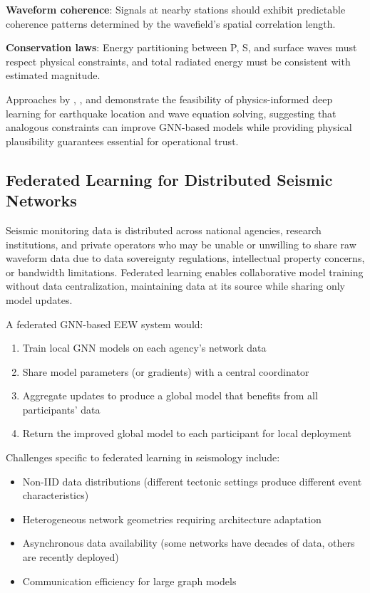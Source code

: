 \documentclass[review,authoryear]{elsarticle}
\begin{document}
\textbf{Waveform coherence}: Signals at nearby stations should exhibit predictable coherence patterns determined by the wavefield's spatial correlation length.

\textbf{Conservation laws}: Energy partitioning between P, S, and surface waves must respect physical constraints, and total radiated energy must be consistent with estimated magnitude.

Approaches by \citet{rasht2022physics}, \citet{smith2022hyposvi}, and \citet{moseley2020solving} demonstrate the feasibility of physics-informed deep learning for earthquake location and wave equation solving, suggesting that analogous constraints can improve GNN-based models while providing physical plausibility guarantees essential for operational trust.

\subsection{Federated Learning for Distributed Seismic Networks}

Seismic monitoring data is distributed across national agencies, research institutions, and private operators who may be unable or unwilling to share raw waveform data due to data sovereignty regulations, intellectual property concerns, or bandwidth limitations. Federated learning \citep{mcmahan2017communication, li2020federated} enables collaborative model training without data centralization, maintaining data at its source while sharing only model updates.

A federated GNN-based EEW system would:
\begin{enumerate}
  \item Train local GNN models on each agency's network data
  \item Share model parameters (or gradients) with a central coordinator
  \item Aggregate updates to produce a global model that benefits from all participants' data
  \item Return the improved global model to each participant for local deployment
\end{enumerate}

Challenges specific to federated learning in seismology include:
\begin{itemize}
  \item Non-IID data distributions (different tectonic settings produce different event characteristics)
  \item Heterogeneous network geometries requiring architecture adaptation
  \item Asynchronous data availability (some networks have decades of data, others are recently deployed)
  \item Communication efficiency for large graph models
\end{itemize}
\end{document}
